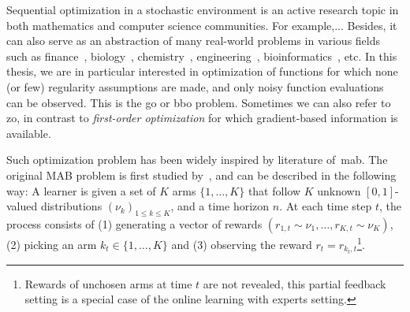Sequential optimization in a stochastic environment is an active research topic in both mathematics and computer science communities. For example,... Besides, it can also serve as an abstraction of many real-world problems in various fields such as finance~\citep{ziemba2010}, biology~\citep{durand2018contextual}, chemistry~\citep{floudas2000}, engineering~\citep{wang2007}, bioinformatics~\citep{moles2003}, etc. In this thesis, we are in particular interested in optimization of functions for which none (or few) regularity assumptions are made, and only noisy function evaluations can be observed. This is the \gls{go} or \gls{bbo} problem. Sometimes we can also refer to \gls{zo}, in contrast to \emph{first-order optimization} for which gradient-based information is available.



Such optimization problem has been widely inspired by literature of~\gls{mab}. The original MAB problem is first studied by~\cite{thompson1933}, and can be described in the following way: A learner is given a set of $K$ arms $\{1,\ldots,K\}$ that follow $K$ unknown $[0,1]$-valued distributions $(\nu_k)_{1 \leq k \leq K}$, and a time horizon $n$. At each time step $t$, the process consists of (1) generating a vector of rewards $(r_{1,t} \sim \nu_1, \ldots, r_{K,t} \sim \nu_K)$, (2) picking an arm $k_t \in \{1,\ldots,K\}$ and (3) observing the reward $r_t = r_{k_t, t}$\footnote{Rewards of unchosen arms at time $t$ are not revealed, this partial feedback setting is a special case of the online learning with experts setting.}.

